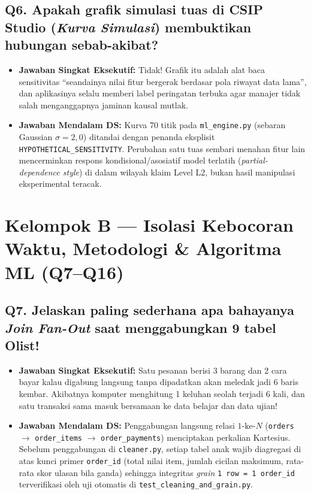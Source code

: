 \documentclass[11pt,a4paper,oneside]{book}
\newcommand{\code}[1]{{\small\nolinkurl{#1}}}
\begin{document}
\subsection*{Q6. Apakah grafik simulasi tuas di CSIP Studio (\emph{Kurva Simulasi}) membuktikan hubungan sebab-akibat?}
\begin{itemize}
  \item \textbf{Jawaban Singkat Eksekutif:} Tidak! Grafik itu adalah alat baca sensitivitas ``seandainya nilai fitur bergerak berdasar pola riwayat data lama'', dan aplikasinya selalu memberi label peringatan terbuka agar manajer tidak salah menganggapnya jaminan kausal mutlak.
  \item \textbf{Jawaban Mendalam DS:} Kurva 70 titik pada \code{ml_engine.py} (sebaran Gaussian $\sigma = 2{,}0$) ditandai dengan penanda eksplisit \code{HYPOTHETICAL_SENSITIVITY}. Perubahan satu tuas sembari menahan fitur lain mencerminkan respons kondisional/asosiatif model terlatih (\emph{partial-dependence style}) di dalam wilayah klaim Level L2, bukan hasil manipulasi eksperimental teracak.
\end{itemize}

\section{Kelompok B --- Isolasi Kebocoran Waktu, Metodologi \& Algoritma ML (Q7--Q16)}

\subsection*{Q7. Jelaskan paling sederhana apa bahayanya \emph{Join Fan-Out} saat menggabungkan 9 tabel Olist!}
\begin{itemize}
  \item \textbf{Jawaban Singkat Eksekutif:} Satu pesanan berisi 3 barang dan 2 cara bayar kalau digabung langsung tanpa dipadatkan akan meledak jadi 6 baris kembar. Akibatnya komputer menghitung 1 keluhan seolah terjadi 6 kali, dan satu transaksi sama masuk bersamaan ke data belajar dan data ujian!
  \item \textbf{Jawaban Mendalam DS:} Penggabungan langsung relasi $1\text{-ke-}N$ (\code{orders} $\rightarrow$ \code{order_items} $\rightarrow$ \code{order_payments}) menciptakan perkalian Kartesius. Sebelum penggabungan di \code{cleaner.py}, setiap tabel anak wajib diagregasi di atas kunci primer \code{order_id} (total nilai item, jumlah cicilan maksimum, rata-rata skor ulasan bila ganda) sehingga integritas \emph{grain} \code{1 row = 1 order_id} terverifikasi oleh uji otomatis di \code{test_cleaning_and_grain.py}.
\end{itemize}
\end{document}

